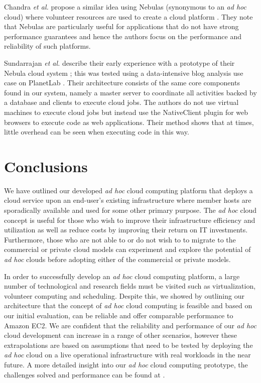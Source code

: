 \documentclass[10pt, conference, compsocconf]{IEEEtran}
\begin{document}
Chandra \textit{et al.} propose a similar idea using Nebulas (synonymous to an \textit{ad hoc} cloud) where volunteer resources are used to create a cloud platform \cite{Chandra2009}. They note that Nebulas are particularly useful for applications that do not have strong performance guarantees and hence the authors focus on the performance and reliability of such platforms.

Sundarrajan \textit{et al.} describe their early experience with a prototype of their Nebula cloud system \cite{Weissman2011}; this was tested using a data-intensive blog analysis use case on PlanetLab \cite{planetlab}. Their architecture consists of the same core components found in our system, namely a master server to coordinate all activities backed by a database and clients to execute cloud jobs. The authors do not use virtual machines to execute cloud jobs but instead use the NativeClient plugin for web browsers to execute code as web applications. Their method shows that at times, little overhead can be seen when executing code in this way.

\section{Conclusions}
We have outlined our developed \textit{ad hoc} cloud computing platform that deploys a cloud service upon an end-user's existing infrastructure where member hosts are sporadically available and used for some other primary purpose. The \textit{ad hoc} cloud concept is useful for those who wish to improve their infrastructure efficiency and utilization as well as reduce costs by improving their return on IT investments. Furthermore, those who are not able to or do not wish to to migrate to the commercial or private cloud models can experiment and explore the potential of \textit{ad hoc} clouds before adopting either of the commercial or private models. 

In order to successfully develop an \textit{ad hoc} cloud computing platform, a large number of technological and research fields must be visited such as virtualization, volunteer computing and scheduling. Despite this, we showed by outlining our architecture that the concept of \textit{ad hoc} cloud computing is feasible and based on our initial evaluation, can be reliable and offer comparable performance to Amazon EC2. We are confident that the reliability and performance of our \textit{ad hoc} cloud development can increase in a range of other scenarios, however these extrapolations are based on assumptions that need to be tested by deploying the \textit{ad hoc} cloud on a live operational infrastructure with real workloads in the near future. A more detailed insight into our \textit{ad hoc} cloud computing prototype, the challenges solved and performance can be found at \cite{McGilvary2014}.

	
		
\end{document}
